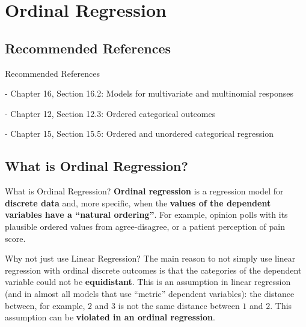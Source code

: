 \section{Ordinal Regression}

\subsection{Recommended References}
\begin{frame}{Recommended References}
	\begin{vfilleditems}
		\item \textcite{gelman2013bayesian} - Chapter 16, Section 16.2: Models for multivariate and multinomial responses
		\item \textcite{mcelreath2020statistical} - Chapter 12, Section 12.3: Ordered categorical outcomes
		\item \textcite{gelman2020regression} - Chapter 15, Section 15.5: Ordered and unordered categorical regression
		\item \textcite{Burkner_Vuorre_2019}
		\item \textcite{Semenova_2019}
	\end{vfilleditems}
\end{frame}

\subsection{What is Ordinal Regression?}
\begin{frame}{What is Ordinal Regression?}
	\textbf{Ordinal regression} is a regression model for \textbf{discrete data} and,
	more specific, when the \textbf{values of the dependent variables have a ``natural ordering''}.
	\vfill
	For example, opinion polls with its plausible ordered values from agree-disagree,
	or a patient perception of pain score.
\end{frame}

\begin{frame}{Why not just use Linear Regression?}
	The main reason to not simply use linear regression with ordinal discrete outcomes is
	that the categories of the dependent variable could not be \textbf{equidistant}.
	This is an assumption in linear regression
	(and in almost all models that use ``metric'' dependent variables):
	the distance between, for example, $2$ and $3$ is not the same distance between $1$ and $2$.
	\vfill
	This assumption can be \textbf{violated in an ordinal regression}.
\end{frame}


